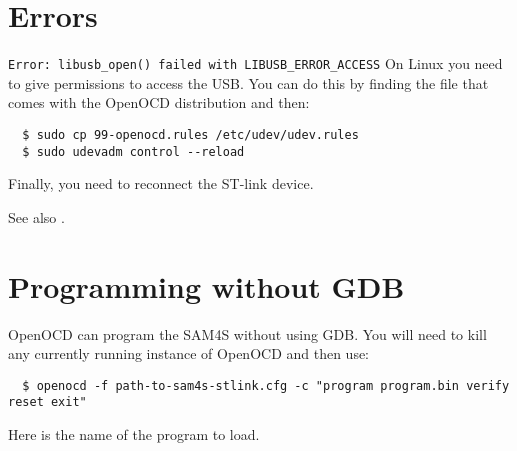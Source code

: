 \section{Errors}
\label{openocd_errors}

\verb+Error: libusb_open() failed with LIBUSB_ERROR_ACCESS+ On Linux
you need to give permissions to access the USB.  You can do this by
finding the file  that comes with the OpenOCD
distribution and then:
%
\begin{verbatim}
  $ sudo cp 99-openocd.rules /etc/udev/udev.rules
  $ sudo udevadm control --reload
\end{verbatim}
%
Finally, you need to reconnect the ST-link device.


See also .


\section{Programming without GDB}

OpenOCD can program the SAM4S without using GDB.  You will need to
kill any currently running instance of OpenOCD and then use:
%
\begin{verbatim}
  $ openocd -f path-to-sam4s-stlink.cfg -c "program program.bin verify reset exit"
\end{verbatim}
%
Here  is the name of the program to load.

